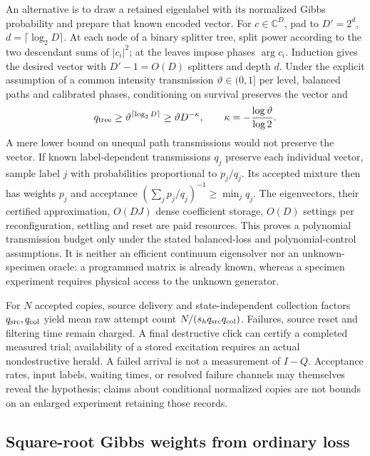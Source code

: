 \documentclass[aps,pra,reprint,superscriptaddress,longbibliography]{revtex4-2}
\begin{document}
An alternative is to draw a retained eigenlabel with its normalized
Gibbs probability and prepare that known encoded vector. For
$c\in\mathbb C^D$, pad to $D'=2^d$, $d=\lceil\log_2D\rceil$.
At each node of a binary splitter tree, split power according to
the two descendant sums of $|c_i|^2$; at the leaves impose phases
$\arg c_i$. Induction gives the desired vector with $D'-1=O(D)$
splitters and depth $d$. Under the explicit assumption of a common
intensity transmission $\vartheta\in(0,1]$ per level, balanced paths
and calibrated phases, conditioning on survival preserves the vector
and
\[
 q_{\rm tree}\ge\vartheta^{\lceil\log_2D\rceil}
 \ge\vartheta D^{-\kappa},\qquad
 \kappa=-\frac{\log\vartheta}{\log2}.
\]
A mere lower bound on unequal path transmissions would not preserve
the vector. If known label-dependent transmissions $q_j$ preserve
each individual vector, sample label $j$ with probabilities
proportional to $p_j/q_j$. Its accepted mixture then has weights $p_j$
and acceptance $(\sum_jp_j/q_j)^{-1}\ge\min_jq_j$.
The eigenvectors, their certified approximation, $O(DJ)$ dense
coefficient storage, $O(D)$ settings per reconfiguration, settling and
reset are paid resources. This proves a polynomial transmission budget
only under the stated balanced-loss and polynomial-control assumptions.
It is neither an efficient continuum eigensolver nor an unknown-specimen
oracle: a programmed matrix is already known, whereas a specimen
experiment requires physical access to the unknown generator.

For $N$ accepted copies, source delivery and state-independent
collection factors $q_{\rm src},q_{\rm col}$ yield mean raw attempt
count $N/(s_hq_{\rm src}q_{\rm col})$. Failures, source reset and
filtering time remain charged. A final destructive click can certify
a completed measured trial; availability of a stored excitation
requires an actual nondestructive herald. A failed arrival is not a
measurement of $I-Q$. Acceptance rates, input labels, waiting times,
or resolved failure channels may themselves reveal the hypothesis;
claims about conditional normalized copies are not bounds on an
enlarged experiment retaining those records.

\subsection{Square-root Gibbs weights from ordinary loss}
\label{sgt:prep:subordination}
\end{document}

